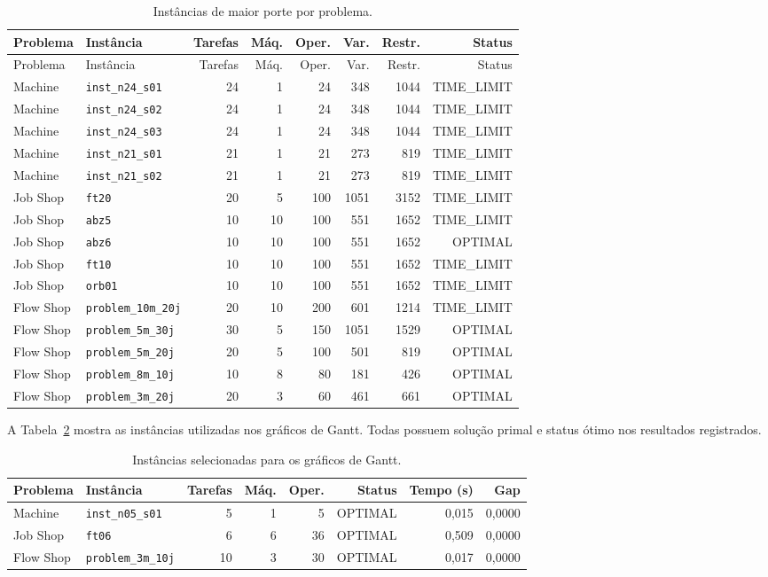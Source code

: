 \documentclass[12pt,a4paper]{article}
\begin{document}
\begin{longtable}{llrrrrrr}
\caption{Instâncias de maior porte por problema.}
\label{tab:maior-porte}\\
\toprule
Problema & Instância & Tarefas & Máq. & Oper. & Var. & Restr. & Status \\
\midrule
\endfirsthead
\toprule
Problema & Instância & Tarefas & Máq. & Oper. & Var. & Restr. & Status \\
\midrule
\endhead
Machine & \texttt{inst\_n24\_s01} & 24 & 1 & 24 & 348 & 1044 & TIME\_LIMIT \\
Machine & \texttt{inst\_n24\_s02} & 24 & 1 & 24 & 348 & 1044 & TIME\_LIMIT \\
Machine & \texttt{inst\_n24\_s03} & 24 & 1 & 24 & 348 & 1044 & TIME\_LIMIT \\
Machine & \texttt{inst\_n21\_s01} & 21 & 1 & 21 & 273 & 819 & TIME\_LIMIT \\
Machine & \texttt{inst\_n21\_s02} & 21 & 1 & 21 & 273 & 819 & TIME\_LIMIT \\
Job Shop & \texttt{ft20} & 20 & 5 & 100 & 1051 & 3152 & TIME\_LIMIT \\
Job Shop & \texttt{abz5} & 10 & 10 & 100 & 551 & 1652 & TIME\_LIMIT \\
Job Shop & \texttt{abz6} & 10 & 10 & 100 & 551 & 1652 & OPTIMAL \\
Job Shop & \texttt{ft10} & 10 & 10 & 100 & 551 & 1652 & TIME\_LIMIT \\
Job Shop & \texttt{orb01} & 10 & 10 & 100 & 551 & 1652 & TIME\_LIMIT \\
Flow Shop & \texttt{problem\_10m\_20j} & 20 & 10 & 200 & 601 & 1214 & TIME\_LIMIT \\
Flow Shop & \texttt{problem\_5m\_30j} & 30 & 5 & 150 & 1051 & 1529 & OPTIMAL \\
Flow Shop & \texttt{problem\_5m\_20j} & 20 & 5 & 100 & 501 & 819 & OPTIMAL \\
Flow Shop & \texttt{problem\_8m\_10j} & 10 & 8 & 80 & 181 & 426 & OPTIMAL \\
Flow Shop & \texttt{problem\_3m\_20j} & 20 & 3 & 60 & 461 & 661 & OPTIMAL \\
\bottomrule
\end{longtable}

A Tabela~\ref{tab:gantt-instancias} mostra as instâncias utilizadas nos
gráficos de Gantt. Todas possuem solução primal e status ótimo nos resultados
registrados.

\begin{table}[H]
\centering
\caption{Instâncias selecionadas para os gráficos de Gantt.}
\label{tab:gantt-instancias}
\scriptsize
\begin{tabular}{llrrrrrr}
\toprule
Problema & Instância & Tarefas & Máq. & Oper. & Status & Tempo (s) & Gap \\
\midrule
Machine & \texttt{inst\_n05\_s01} & 5 & 1 & 5 & OPTIMAL & 0,015 & 0,0000 \\
Job Shop & \texttt{ft06} & 6 & 6 & 36 & OPTIMAL & 0,509 & 0,0000 \\
Flow Shop & \texttt{problem\_3m\_10j} & 10 & 3 & 30 & OPTIMAL & 0,017 & 0,0000 \\
\bottomrule
\end{tabular}
\end{table}
\end{document}
